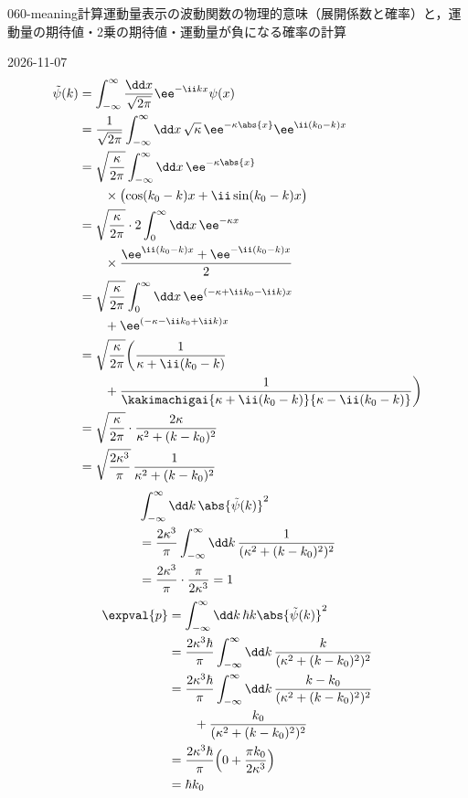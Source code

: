 \documentclass[uplatex,dvipdfmx,a4paper,11pt]{jsarticle}
\begin{document}
\begin{mondai}{060-meaning}{計算}{運動量表示の波動関数の物理的意味（展開係数と確率）と，運動量の期待値・2乗の期待値・運動量が負になる確率の計算}
\begin{kotaeutsushi}{2026-11-07}
\begin{align*}
\tilde{\psi}(k)&=\int_{-\infty}^{\infty}\frac{\dd x}{\sqrt{2\pi}}\ee^{-\ii kx}\psi(x)\\
&=\frac{1}{\sqrt{2\pi}}\int_{-\infty}^{\infty}\dd x\,\sqrt{\kappa}\,\ee^{-\kappa\abs{x}}\ee^{\ii(k_{0}-k)x}\\
&=\sqrt{\frac{\kappa}{2\pi}}\int_{-\infty}^{\infty}\dd x\,\ee^{-\kappa\abs{x}}\\
&\qquad\times\bigl(\cos(k_{0}-k)x+\ii\sin(k_{0}-k)x\bigr)\\
&=\sqrt{\frac{\kappa}{2\pi}}\cdot2\int_{0}^{\infty}\dd x\,\ee^{-\kappa x}\\
&\qquad\times\frac{\ee^{\ii(k_{0}-k)x}+\ee^{-\ii(k_{0}-k)x}}{2}\\
&=\sqrt{\frac{\kappa}{2\pi}}\int_{0}^{\infty}\dd x\,\ee^{(-\kappa+\ii k_{0}-\ii k)x}\\
&\qquad+\ee^{(-\kappa-\ii k_{0}+\ii k)x}\\
&=\sqrt{\frac{\kappa}{2\pi}}\biggl(\frac{1}{\kappa+\ii(k_{0}-k)}\\
&\qquad+\frac{1}{\kakimachigai{\kappa+\ii(k_{0}-k)}{\kappa-\ii(k_{0}-k)}}\biggr)\\
&=\sqrt{\frac{\kappa}{2\pi}}\cdot\frac{2\kappa}{\kappa^{2}+(k-k_{0})^{2}}\\
&=\sqrt{\frac{2\kappa^{3}}{\pi}}\,\frac{1}{\kappa^{2}+(k-k_{0})^{2}}
\end{align*}
\begin{align*}
&\int_{-\infty}^{\infty}\dd k\,\abs{\tilde{\psi}(k)}^{2}\\
&=\frac{2\kappa^{3}}{\pi}\int_{-\infty}^{\infty}\dd k\,\frac{1}{(\kappa^{2}+(k-k_{0})^{2})^{2}}\\
&=\frac{2\kappa^{3}}{\pi}\cdot\frac{\pi}{2\kappa^{3}}=1
\end{align*}
\begin{align*}
\expval{p}&=\int_{-\infty}^{\infty}\dd k\,\hbar k\abs{\tilde{\psi}(k)}^{2}\\
&=\frac{2\kappa^{3}\hbar}{\pi}\int_{-\infty}^{\infty}\dd k\,\frac{k}{(\kappa^{2}+(k-k_{0})^{2})^{2}}\\
&=\frac{2\kappa^{3}\hbar}{\pi}\int_{-\infty}^{\infty}\dd k\,\frac{k-k_{0}}{(\kappa^{2}+(k-k_{0})^{2})^{2}}\\
&\qquad+\frac{k_{0}}{(\kappa^{2}+(k-k_{0})^{2})^{2}}\\
&=\frac{2\kappa^{3}\hbar}{\pi}\Bigl(0+\frac{\pi k_{0}}{2\kappa^{3}}\Bigr)\\
&=\hbar k_{0}
\end{align*}

\end{kotaeutsushi}
\end{mondai}
\end{document}
